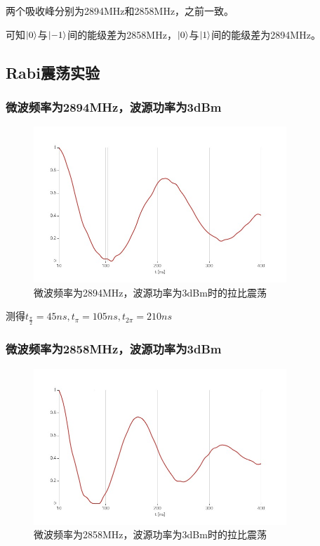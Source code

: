 \documentclass[a4paper,UTF8]{ctexart}
\begin{document}
两个吸收峰分别为2894MHz和2858MHz，之前一致。

可知$\ket{0}$与$\ket{-1}$间的能级差为2858MHz，$\ket{0}$与$\ket{1}$间的能级差为2894MHz。

\subsection{Rabi震荡实验}

\subsubsection{微波频率为2894MHz，波源功率为3dBm}


\begin{figure}[H]
    \centering
    \begin{minipage}[b]{0.9\textwidth}
        \centering
        \includegraphics[width=0.85\textwidth]{./3.jpeg}
        \caption{微波频率为2894MHz，波源功率为3dBm时的拉比震荡}
    \end{minipage}
\end{figure}

测得$t_{\frac{\pi}{2}} = 45ns, t_{\pi} = 105ns,t_{2\pi} = 210ns$

\subsubsection{微波频率为2858MHz，波源功率为3dBm}   

\begin{figure}[H]
    \centering
    \begin{minipage}[b]{0.9\textwidth}
        \centering
        \includegraphics[width=0.85\textwidth]{./4.jpeg}
        \caption{微波频率为2858MHz，波源功率为3dBm时的拉比震荡}
    \end{minipage}
\end{figure}
\end{document}
